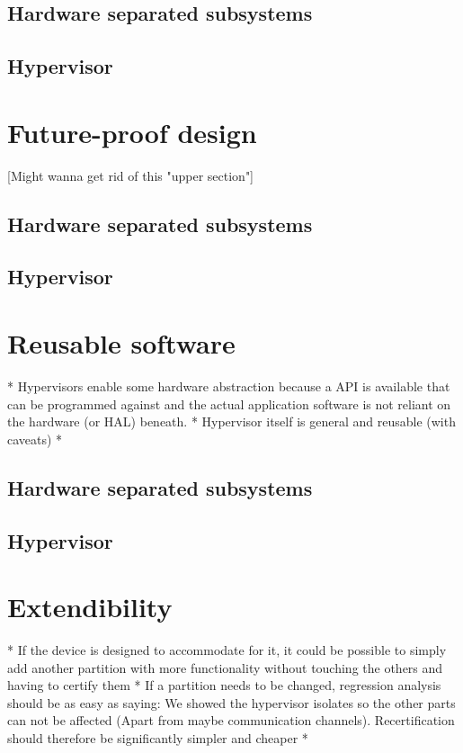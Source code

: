 \subsection{Hardware separated subsystems}
\subsection{Hypervisor}


\section{Future-proof design}
[Might wanna get rid of this "upper section"]
\subsection{Hardware separated subsystems}
\subsection{Hypervisor}


\section{Reusable software}
* Hypervisors enable some hardware abstraction because a API is available that can be programmed against and the actual application software is not reliant on the hardware (or HAL) beneath.
* Hypervisor itself is general and reusable (with caveats)
* 
\subsection{Hardware separated subsystems}
\subsection{Hypervisor}


\section{Extendibility}
* If the device is designed to accommodate for
it, it could be possible to simply add another partition with more functionality without touching the others and having to certify them
* If a partition needs to be changed, regression analysis should be as easy as saying: We showed the hypervisor isolates so the other parts can not be affected (Apart from maybe communication channels). Recertification should therefore be significantly simpler and cheaper
* 

